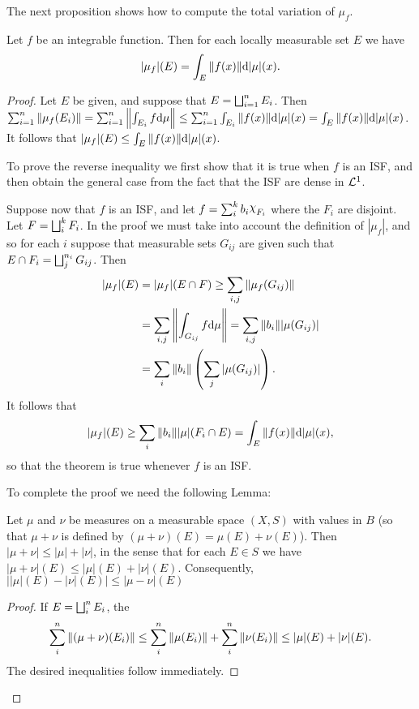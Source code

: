 The next proposition shows how to compute the total variation of $\mu_f$.

\begin{proposition}
\label{prop:total var of indef integral}
Let $f$ be an integrable function. Then for each locally measurable set $E$ we have $$|\mu_f|(E)=\int_E\norm{f(x)}\dd|\mu|(x).$$
\end{proposition}

\begin{proof}
Let $E$ be given, and suppose that $E=\bigsqcup_{i=1}^nE_i$. Then $\sum_{i=1}^n\norm{\mu_f(E_i)} = \sum_{i=1}^n\norm{\int_{E_i}f\dd\mu} \leq \sum_{i=1}^n\int_{E_i}\norm{f(x)}\dd|\mu|(x) = \allowbreak \int_E\norm{f(x)}\dd|\mu|(x)$. It follows that $|\mu_f|(E)\leq\int_E\norm{f(x)}\dd|\mu|(x)$.

To prove the reverse inequality we first show that it is true when $f$ is an ISF, and then obtain the general case from the fact that the ISF are dense in ${\cal L}^1$.

Suppose now that $f$ is an ISF, and let $f=\sum_i^kb_i\idf{F_i}$ where the $F_i$ are disjoint. Let $F=\bigsqcup_i^kF_i$. In the proof we must take into account the definition of $|\mu_f|$, and so for each $i$ suppose that measurable sets $G_{ij}$ are given such that $E\cap F_i=\bigsqcup_j^{n_i}G_{ij}$. Then
\begin{align*}
    |\mu_f|(E)&=|\mu_f|(E\cap F)\geq\sum_{i,j}\norm{\mu_f(G_{ij})}\\
    &=\sum_{i,j}\norm{\int_{G_{ij}}f\dd\mu}=\sum_{i,j}\norm{b_i}|\mu(G_{ij})|\\
    &=\sum_i\norm{b_i}\left(\sum_j|\mu(G_{i j})|\right).
\end{align*}
It follows that $$|\mu_f|(E)\geq\sum_i\norm{b_i}|\mu|(F_i\cap E)=\int_E\norm{f(x)}\dd|\mu|(x),$$ so that the theorem is true whenever $f$ is an ISF.

To complete the proof we need the following Lemma:

\begin{lemma}
Let $\mu$ and $\nu$ be measures on a measurable space $(X,S)$ with values in $B$ (so that $\mu+\nu$ is defined by $(\mu+\nu)(E)=\mu(E)+\nu(E)$). Then $|\mu+\nu|\leq|\mu|+|\nu|$, in the sense that for each $E\in S$ we have $|\mu+\nu|(E)\leq|\mu|(E)+|\nu|(E)$. Consequently, $||\mu|(E)-|\nu|(E)|\leq|\mu-\nu|(E)$
\end{lemma}

\begin{proof}
If $E=\bigsqcup_i^nE_i$, the $$\sum_i^n\norm{(\mu+\nu)(E_i)}\leq\sum_i^n\norm{\mu(E_i)}+\sum_i^n\norm{\nu(E_i)}\leq|\mu|(E)+|\nu|(E).$$ The desired inequalities follow immediately.
\end{proof}


\end{proof}
